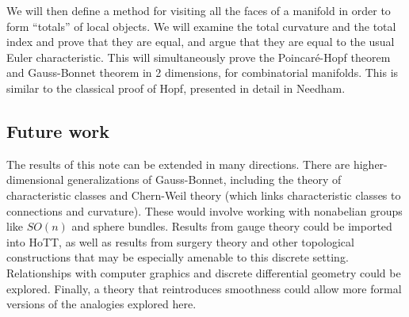 We will then define a method for visiting all the faces of a manifold in order to form ``totals'' of local objects. We will examine the total curvature and the total index and prove that they are equal, and argue that they are equal to the usual Euler characteristic. This will simultaneously prove the Poincaré-Hopf theorem and Gauss-Bonnet theorem in 2 dimensions, for combinatorial manifolds. This is similar to the classical proof of Hopf\cite{hopf}, presented in detail in Needham\cite{needham}.

\subsection{Future work}
The results of this note can be extended in many directions. There are higher-dimensional generalizations of Gauss-Bonnet, including the theory of characteristic classes and Chern-Weil theory (which links characteristic classes to connections and curvature). These would involve working with nonabelian groups like \( SO(n) \) and sphere bundles. Results from gauge theory could be imported into HoTT, as well as results from surgery theory and other topological constructions that may be especially amenable to this discrete setting. Relationships with computer graphics and discrete differential geometry\cite{crane_ddg}\cite{crane_connections} could be explored. Finally, a theory that reintroduces smoothness could allow more formal versions of the analogies explored here. 
